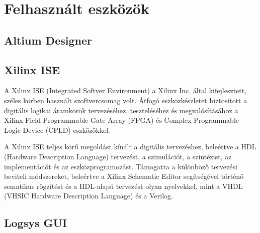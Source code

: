 \chapter{Felhasznált eszközök}

\section{Altium Designer}

\section{Xilinx ISE}

A Xilinx ISE (Integrated Softver Environment) a Xilinx Inc. által kifejlesztett, széles körben használt szoftvercsomag volt. Átfogó eszközkészletet biztosított a digitális logikai áramkörök tervezéséhez, teszteléséhez és megvalósításához a Xilinx Field-Programmable Gate Array (FPGA) és Complex Programmable Logic Device (CPLD) eszközökkel.

A Xilinx ISE teljes körű megoldást kínált a digitális tervezéshez, beleértve a HDL (Hardware Description Language) tervezést, a szimulációt, a szintézist, az implementációt és az eszközprogramozást. Támogatta a különböző tervezési beviteli módszereket, beleértve a Xilinx Schematic Editor segítségével történő sematikus rögzítést és a HDL-alapú tervezést olyan nyelvekkel, mint a VHDL (VHSIC Hardware Description Language) és a Verilog.

\section{Logsys GUI}